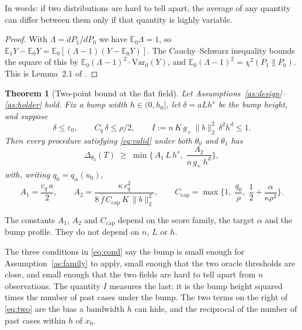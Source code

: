 \documentclass[11pt]{article}
\newtheorem{theorem}{Theorem}
\theoremstyle{definition}
\theoremstyle{remark}
\newcommand{\E}{\mathbb{E}}
\newcommand{\Var}{\mathrm{Var}}
\newcommand{\chis}{\chi^2}
\begin{document}
In words: if two distributions are hard to tell apart, the average of any quantity can
differ between them only if that quantity is highly variable.

\begin{proof}
With $\Lambda=dP_1/dP_0$ we have $\E_0\Lambda=1$, so
$\E_1Y-\E_0Y=\E_0[(\Lambda-1)(Y-\E_0Y)]$. The Cauchy--Schwarz inequality bounds the square
of this by $\E_0(\Lambda-1)^2\cdot\Var_0(Y)$, and $\E_0(\Lambda-1)^2=\chis(P_1\|P_0)$. This
is Lemma~2.1 of \citet{derumigny2023lower}.
\end{proof}

\begin{theorem}[Two-point bound at the flat field]\label{thm:two}
Let Assumptions~\ref{as:design}--\ref{as:holder} hold. Fix a bump width $h\in(0,h_0]$, let
$\delta=aLh^s$ be the bump height, and suppose
\begin{equation}\label{eq:cond}
  \delta\le\varepsilon_0,\qquad
  C_q\,\delta\le\rho/2,\qquad
  I:=n\,K\,g_+\,\|b\|_2^2\,\delta^2h^d\le 1 .
\end{equation}
Then every procedure satisfying \eqref{eq:valid} under both $\theta_0$ and $\theta_1$ has
\begin{equation}\label{eq:two}
  \Delta_{\theta_0}(T)
  \;\ge\;
  \min\Big\{\,A_1\,L\,h^{s},\;\frac{A_2}{n\,g_+\,h^{d}}\Big\},
\end{equation}
with, writing $q_0=q_\alpha(u_0)$,
\[
  A_1=\frac{c_q\,a}{2},\qquad
  A_2=\frac{\kappa\,c_q^2}{8\,\bar f\,C_{\mathrm{cap}}\,K\,\|b\|_2^2},\qquad
  C_{\mathrm{cap}}=\max\Big\{1,\;\frac{q_0}{\rho},\;\frac12+\frac{\alpha}{\kappa\rho^2}\Big\}.
\]
\end{theorem}

The constants $A_1$, $A_2$ and $C_{\mathrm{cap}}$ depend on the score family, the target
$\alpha$ and the bump profile. They do not depend on $n$, $L$ or $h$.

The three conditions in \eqref{eq:cond} say the bump is small enough for
Assumption~\ref{as:family} to apply, small enough that the two oracle thresholds are close,
and small enough that the two fields are hard to tell apart from $n$ observations. The
quantity $I$ measures the last: it is the bump height squared times the number of past
cases under the bump. The two terms on the right of \eqref{eq:two} are the bias a bandwidth
$h$ can hide, and the reciprocal of the number of past cases within $h$ of $x_0$.
\end{document}
